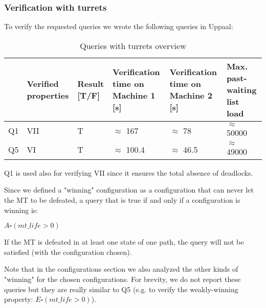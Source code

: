 \documentclass[
10pt, %
a4paper, %
oneside, %
headinclude,footinclude, %
BCOR5mm, %
]{scrartcl}
\begin{document}
			\subsubsection{Verification with turrets}
				To verify the requested queries we wrote the following queries in Uppaal:
				
				\begin{table}[H]
					\centering
					\begin{tabularx}{\textwidth}{||c|>{\raggedright\arraybackslash}X|>{\raggedright\arraybackslash}X|>{\raggedright\arraybackslash}X|>{\raggedright\arraybackslash}X|>{\raggedright\arraybackslash}X||}
						\hline
						& Verified properties & Result [T/F] & Verification time on Machine 1 [s] & Verification time on Machine 2 [s] & Max. past-waiting list load \\
						\hline
						Q1 & VII & T & $\approx$ 167 & $\approx$ 78 & $\approx$ 50000\\ \hline
						Q5 & VI & T &  $\approx$ 100.4 & $\approx$ 46.5 & $\approx$ 49000  \\
						\hline
					\end{tabularx}
					\caption{Queries with turrets overview}
				\end{table}
				
				Q1 is used also for verifying VII since it ensures the total absence of deadlocks.
				
				Since we defined a "winning" configuration as a configuration that can never let the MT to be defeated, a query that is true if and only if a configuration is winning is:
				\begin{center}
					$A\square(mt\_life>0)$	
				\end{center}
				If the MT is defeated in at least one state of one path, the query will not be satisfied (with the configuration chosen).
				
				Note that in the configurations section we also analyzed the other kinds of "winning" for the chosen configurations. For brevity, we do not report these queries but they are really similar to Q5 (e.g. to verify the weakly-winning property: $E\square(mt\_life>0)$).
\end{document}
